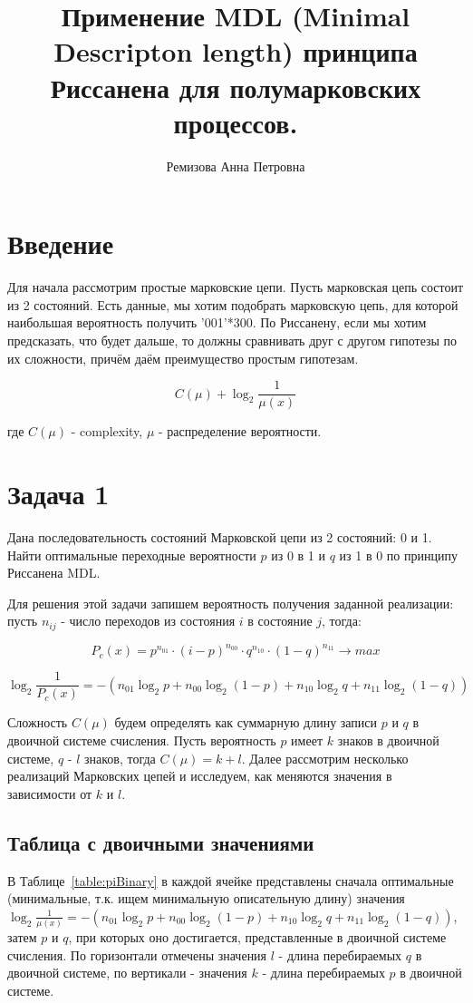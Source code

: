 \documentclass[12pt]{article}
\begin{document}
	\title{Применение MDL (Minimal Descripton length) принципа Риссанена для полумарковских процессов.}
	\author{Ремизова Анна Петровна}
	\maketitle
	
	\section*{Введение}
	Для начала рассмотрим простые марковские цепи. Пусть марковская цепь состоит из 2 состояний. Есть данные, мы хотим подобрать марковскую цепь, для которой наибольшая вероятность получить '001'*300. По Риссанену, если мы хотим предсказать, что будет дальше, то должны сравнивать друг с другом гипотезы по их сложности, причём даём преимущество простым гипотезам.
	
	$$C(\mu)+\log_2{\frac{1}{\mu(x)}}$$
	
	где $C(\mu)$ - complexity, $\mu$ - распределение вероятности.
	
	\section*{Задача 1}
	Дана последовательность состояний Марковской цепи из 2 состояний: 0 и 1. Найти оптимальные переходные вероятности $p$ из 0 в 1 и $q$ из 1 в 0 по принципу Риссанена MDL. 
	
	Для решения этой задачи запишем вероятность получения заданной реализации: пусть $n_{ij}$ - число переходов из состояния $i$ в состояние $j$, тогда:
	
	$$P_c(x) = p^{n_{01}}\cdot(i-p)^{n_{00}}\cdot q^{n_{10}}\cdot(1-q)^{n_{11}}\to max$$ 
	
	$$\log_2{\frac{1}{P_c(x)}}=-(n_{01}\log_2{p}+n_{00}\log_2{(1-p)}+n_{10}\log_2{q}+n_{11}\log_2{(1-q)})$$
	
	Сложность $C(\mu)$ будем определять как суммарную длину записи $p$ и $q$ в двоичной системе счисления. Пусть вероятность $p$ имеет $k$ знаков в двоичной системе, $q$ - $l$ знаков, тогда $C(\mu)=k+l$. Далее рассмотрим несколько реализаций Марковских цепей и исследуем, как меняются значения в зависимости от $k$ и $l$.
	
	\subsection*{Таблица с двоичными значениями}
	В Таблице~\ref{table:piBinary} в каждой ячейке представлены сначала оптимальные (минимальные, т.к. ищем минимальную описательную длину) значения $\log_2{\frac{1}{\mu(x)}}=-(n_{01}\log_2{p}+n_{00}\log_2{(1-p)}+n_{10}\log_2{q}+n_{11}\log_2{(1-q)})$, затем $p$ и $q$, при которых оно достигается, представленные в двоичной системе счисления. По горизонтали отмечены значения $l$ - длина перебираемых $q$  в двоичной системе, по вертикали - значения $k$ - длина перебираемых $p$  в двоичной системе.
	
\end{document}
